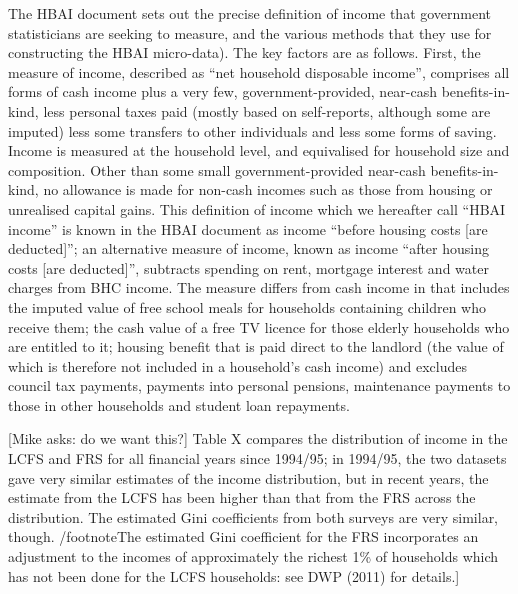 The HBAI document sets out the precise definition of income that government statisticians are seeking to measure, and the various methods that they use for constructing the HBAI micro-data). The key factors are as follows. First, the measure of income, described as ``net household disposable income'', comprises all forms of cash income plus a very few, government-provided, near-cash benefits-in-kind, less personal taxes paid (mostly based on self-reports, although some are imputed) less some transfers to other individuals and less some forms of saving. Income is measured at the household level, and equivalised for household size and composition.  Other than some small government-provided near-cash benefits-in-kind, no allowance is made for non-cash incomes such as those from housing or unrealised capital gains. This definition of income which we hereafter call ``HBAI income'' is known in the HBAI document as income ``before housing costs [are deducted]''; an alternative measure of income, known as income ``after housing costs [are deducted]'', subtracts spending on rent, mortgage interest and water charges from BHC income. The measure differs from cash income in that includes the imputed value of free school meals for households containing children who receive them; the cash value of a free TV licence for those elderly households who are entitled to it; housing benefit that is paid direct to the landlord (the value of which is therefore not included in a household's cash income) and excludes council tax payments, payments into personal pensions, maintenance payments to those in other households and student loan repayments.

[Mike asks: do we want this?] Table X compares the distribution of income in the LCFS and FRS for all financial years since 1994/95; in 1994/95, the two datasets gave very similar estimates of the income distribution, but in recent years, the estimate from the LCFS has been higher than that from the FRS across the distribution. The estimated Gini coefficients from both surveys are very similar, though. /footnote{The estimated Gini coefficient for the FRS incorporates an adjustment to the incomes of approximately the richest 1\% of households which has not been done for the LCFS households: see DWP (2011) for details.}]

